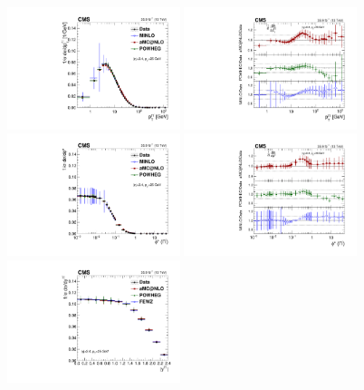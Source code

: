 \begin{figure}
	\centering
	\includegraphics[width=0.45\textwidth]{figures/zpt/zll_norm.pdf}
        \includegraphics[width=0.45\textwidth]{figures/zpt/zll_ratio_norm.pdf}                      
	\includegraphics[width=0.45\textwidth]{figures/zpt/zll_phi_norm.pdf}
	\includegraphics[width=0.45\textwidth]{figures/zpt/zll_phi_ratio_norm.pdf}
        \includegraphics[width=0.45\textwidth]{figures/zpt/zll_rap_norm.pdf}  

\end{figure}
